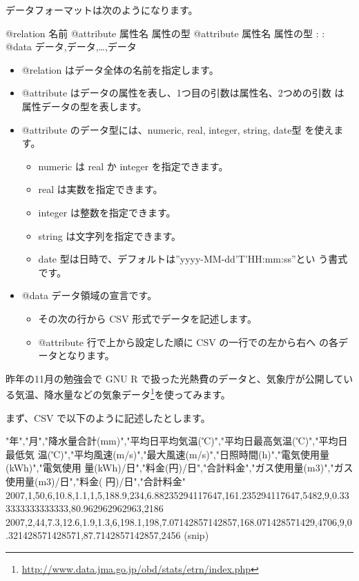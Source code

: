 \documentclass[mingoth,a4paper]{jsarticle}
\begin{document}
データフォーマットは次のようになります。

\begin{commandline}
@relation 名前
@attribute 属性名 属性の型
@attribute 属性名 属性の型
:
:
@data
データ,データ,…,データ
\end{commandline}

\begin{itemize}
\item @relation はデータ全体の名前を指定します。
\item @attribute はデータの属性を表し、1つ目の引数は属性名、2つめの引数
      は属性データの型を表します。
\item @attribute のデータ型には、numeric, real, integer, string, date型
      を使えます。
      \begin{itemize}
       \item numeric は real か integer を指定できます。
       \item real は実数を指定できます。
       \item integer は整数を指定できます。
       \item string は文字列を指定できます。
       \item date 型は日時で、デフォルトは''yyyy-MM-dd'T'HH:mm:ss''とい
	     う書式です。
      \end{itemize}
 \item @data データ領域の宣言です。
       \begin{itemize}
	\item その次の行から CSV 形式でデータを記述します。
	\item @attribute 行で上から設定した順に CSV の一行での左から右へ
	      の各データとなります。
       \end{itemize}
\end{itemize}

昨年の11月の勉強会で GNU R で扱った光熱費のデータと、気象庁が公開してい
る気温、降水量などの気象データ\footnote{\url{http://www.data.jma.go.jp/obd/stats/etrn/index.php}}を使ってみます。

まず、CSV で以下のように記述したとします。
\begin{commandline}
"年","月","降水量合計(mm)","平均日平均気温(℃)","平均日最高気温(℃)","平均日最低気
温(℃)","平均風速(m/s)","最大風速(m/s)","日照時間(h)","電気使用量(kWh)","電気使用
量(kWh)/日","料金(円)/日","合計料金","ガス使用量(m3)","ガス使用量(m3)/日","料金(
円)/日","合計料金"
2007,1,50,6,10.8,1.1,1,5,188.9,234,6.88235294117647,161.235294117647,5482,9,0.333333333333333,80.962962962963,2186
2007,2,44,7.3,12.6,1.9,1.3,6,198.1,198,7.07142857142857,168.071428571429,4706,9,0.321428571428571,87.7142857142857,2456
(snip)
\end{commandline}
\end{document}
